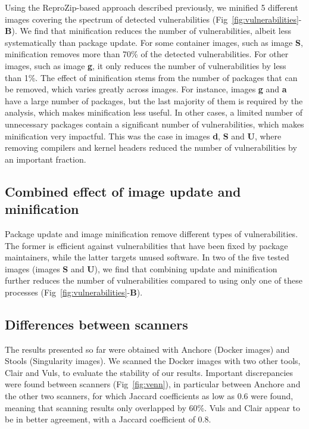 \documentclass[a4paper,num-refs]{oup-contemporary}
\begin{document}
Using the ReproZip-based approach described previously, we minified 5
different images covering the spectrum of detected vulnerabilities
(Fig~\ref{fig:vulnerabilities}-\textbf{B}). We find that minification reduces the
number of vulnerabilities, albeit less systematically than package update.
For some container images, such as image \textbf{S}, minification removes more
than 70\% of the detected vulnerabilities. For other images, such as
image \textbf{g}, it only reduces the number of vulnerabilities by less than 1\%.
The effect of minification stems from the number of packages
that can be removed, which varies greatly across images. For
instance, images \textbf{g} and \textbf{a} have a large number of packages,
but the last majority of them is required by the analysis, which makes
minification less useful. In other cases, a limited number of unnecessary packages contain 
a significant number of vulnerabilities, which makes minification very impactful. 
This was the case in images \textbf{d}, \textbf{S} and \textbf{U}, where removing compilers
and kernel headers reduced the number of vulnerabilities by an important fraction. 

\subsection{Combined effect of image update and  minification}

Package update and image minification remove different types of
vulnerabilities. The former is efficient against vulnerabilities that have
been fixed by package maintainers, while the latter targets unused
software. In two of the five tested images (images \textbf{S} and \textbf{U}), we find that combining update
and minification further reduces the number of vulnerabilities compared to
using only one of these processes
(Fig~\ref{fig:vulnerabilities}-\textbf{B}). \

\subsection{Differences between scanners}

The results presented so far were obtained with Anchore (Docker images) and
Stools (Singularity images). We scanned the Docker images with two other tools,
Clair and Vuls, to evaluate the stability of our results. Important
discrepancies were found between scanners (Fig~\ref{fig:venn}), in
particular between Anchore and the other two scanners, for which Jaccard
coefficients as low as 0.6 were found, meaning that scanning results only
overlapped by 60\%. Vuls and Clair appear to be in better agreement, with a
Jaccard coefficient of 0.8.
\end{document}
